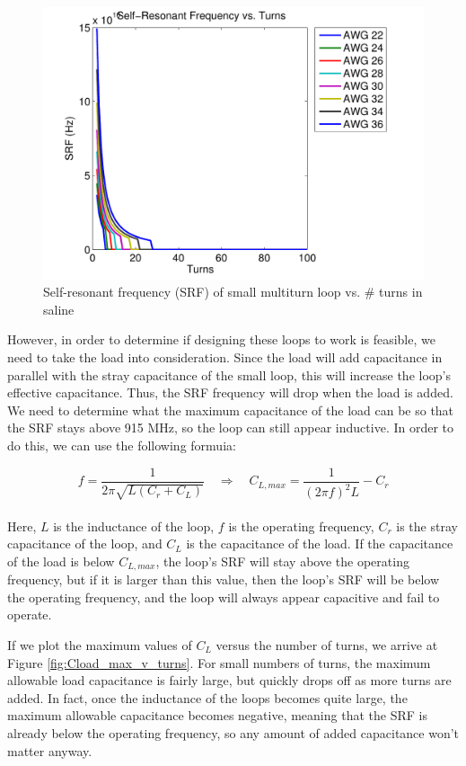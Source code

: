 \documentclass[12pt,onecolumn,titlepage]{article}
\begin{document}
\begin{figure}[htbp]
	\centering
	\includegraphics[width=\textwidth]{Pictures/17May2013/SRF_v_turns}
	\caption{ Self-resonant frequency (SRF) of small multiturn loop vs. \# turns in saline} 
	\label{fig:SRF_v_turns}
\end{figure}



However, in order to determine if designing these loops to work is feasible, we need to take the load into consideration. Since the load will add capacitance in parallel with the stray capacitance of the small loop, this will increase the loop's effective capacitance. Thus, the SRF frequency will drop when the load is added. We need to determine what the maximum capacitance of the load can be so that the SRF stays above 915 MHz, so the loop can still appear inductive. In order to do this, we can use the following formuia:

\[ f = \frac{1}{2 \pi \sqrt{L \left( C_r + C_L \right) } } \quad \Rightarrow \quad C_{L,max} = \frac{1}{ \left( 2 \pi f \right)^2 L } - C_r \] \\

Here, $L$ is the inductance of the loop, $f$ is the operating frequency, $C_r$ is the stray capacitance of the loop, and $C_L$ is the capacitance of the load. If the capacitance of the load is below $C_{L,max}$, the loop's SRF will stay above the operating frequency, but if it is larger than this value, then the loop's SRF will be below the operating frequency, and the loop will always appear capacitive and fail to operate. 

If we plot the maximum values of $C_L$ versus the number of turns, we arrive at Figure \ref{fig:Cload_max_v_turns}. For small numbers of turns, the maximum allowable load capacitance is fairly large, but quickly drops off as more turns are added. In fact, once the inductance of the loops becomes quite large, the maximum allowable capacitance becomes negative, meaning that the SRF is already below the operating frequency, so any amount of added capacitance won't matter anyway. 
\end{document}
